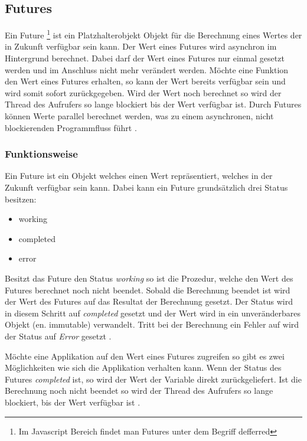 \subsection{Futures}
\label{section:futures}

Ein Future \footnote{Im Javascript Bereich findet man Futures unter dem Begriff defferred} ist ein Platzhalterobjekt Objekt für die Berechnung eines Wertes der in Zukunft verfügbar sein kann. Der Wert eines Futures wird asynchron im Hintergrund berechnet. Dabei darf der Wert eines Futures nur einmal gesetzt werden und im Anschluss nicht mehr verändert werden. Möchte eine Funktion den Wert eines Futures erhalten, so kann der Wert bereits verfügbar sein und wird somit sofort zurückgegeben. Wird der Wert noch berechnet so wird der Thread des Aufrufers so lange blockiert bis der Wert verfügbar ist. Durch Futures können Werte parallel berechnet werden, was zu einem asynchronen, nicht blockierenden Programmfluss führt \cite[]{ScalaFutures}. 

\subsubsection{Funktionsweise} 

Ein Future ist ein Objekt welches einen Wert repräsentiert, welches in der Zukunft verfügbar sein kann. Dabei kann ein Future grundsätzlich drei Status besitzen: 

\begin{itemize}
  \item working
  \item completed
  \item error
\end{itemize}  
Besitzt das Future den Status \emph{working} so ist die Prozedur, welche den Wert des Futures berechnet noch nicht beendet. Sobald die Berechnung beendet ist wird der Wert des Futures auf das Resultat der Berechnung gesetzt. Der Status wird in diesem Schritt auf \emph{completed} gesetzt und der Wert wird in ein unveränderbares Objekt (en. immutable) verwandelt. Tritt bei der Berechnung ein Fehler auf wird der Status auf \emph{Error} gesetzt \cite[]{ScalaFutures}. 

Möchte eine Applikation auf den Wert eines Futures zugreifen so gibt es zwei Möglichkeiten wie sich die Applikation verhalten kann. Wenn der Status des Futures \emph{completed} ist, so wird der Wert der Variable direkt zurückgeliefert. Ist die Berechnung noch nicht beendet so wird der Thread des Aufrufers so lange blockiert, bis der Wert verfügbar ist \cite[]{ScalaFutures}.

